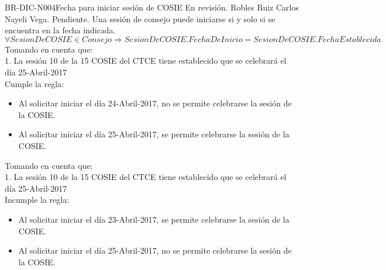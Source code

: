 \begin{BusinessRule}{BR-DIC-N004}{Fecha para iniciar sesión de COSIE}{\bcAutorization} %
	{\btEnabler}     %
{\blControlling}     %
	\BRItem[Estado] En revisión.
	 Robles Ruiz Carlos 	
	 Nayeli Vega.
	 Pendiente.
	\BRItem[Descripción] Una sesión de consejo puede iniciarse si y solo si se encuentra en la fecha indicada.
	\BRItem[Sentencia] $\forall SesionDeCOSIE \in Consejo \Rightarrow SesionDeCOSIE.FechaDeInicio = SesionDeCOSIE.FechaEstablecida$
		Tomando en cuenta que:\\
			 1. La sesión 10 de la 15 COSIE del CTCE tiene establecido que se celebrará el día 25-Abril-2017\\ 
	Cumple la regla:
	\begin{itemize}
		\item Al solicitar iniciar el día 24-Abril-2017, no se permite celebrarse la sesión de la COSIE.
		\item Al solicitar iniciar el día 25-Abril-2017, se permite celebrarse la sesión de la COSIE.
	\end{itemize}
	Tomando en cuenta que:\\
			 1. La sesión 10 de la 15 COSIE del CTCE tiene establecido que se celebrará el día 25-Abril-2017\\ 
	Incumple la regla:
	\begin{itemize}
		\item Al solicitar iniciar el día 23-Abril-2017, se permite celebrarse la sesión de la COSIE.
		\item Al solicitar iniciar el día 25-Abril-2017, no se permite celebrarse la sesión de la COSIE.	\end{itemize}
\end{BusinessRule}


